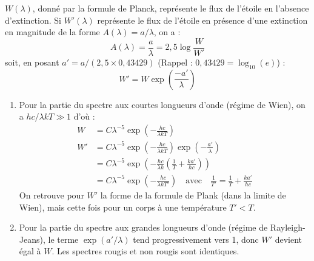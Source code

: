 \documentclass[a4paper,10pt]{report}
\begin{document}
\begin{Answer}
  $W(\lambda)$, donné par la formule de Planck, représente le flux de
  l'étoile en l'absence d'extinction.  Si $W'(\lambda)$ représente le
  flux de l'étoile en présence d'une extinction en magnitude de la
  forme $A(\lambda) = a/\lambda$, on a :
  $$
  A(\lambda)= \frac{a}{\lambda} = 2,5 \log\frac{W}{W'}
  $$
  soit, en posant $a' = a/(2,5 \times0,43429)$ (Rappel : $0,43429 =
  \log_{10}(e)$) :
  $$
  W' = W \exp\left(\frac{-a'}{\lambda}\right)
  $$

  \begin{enumerate}
  \item Pour la partie du spectre aux courtes longueurs d'onde (régime
    de Wien), on a $hc/\lambda kT \gg 1$ d'où :
    \begin{align*}
      W  &= C\lambda^{-5}\exp\left(-\frac{hc}{\lambda kT}\right) \\
      W' &= C\lambda^{-5}\exp\left(-\frac{hc}{\lambda kT}\right)
      \exp\left(-\frac{a'}{\lambda}\right) \\
      &= C\lambda^{-5}\exp\left(-\frac{hc}{\lambda k}
        \left(\frac{1}{T}+\frac{ka'}{hc}\right)\right) \\
      &= C\lambda^{-5}\exp\left(-\frac{hc}{\lambda kT'}\right)
      \quad\text{avec}\quad
      \frac{1}{T'} = \frac{1}{T} + \frac{ka'}{hc}
    \end{align*}
    On retrouve pour $W'$ la forme de la formule de Plank (dans la
    limite de Wien), mais cette fois pour un corps à une température
    $T' < T$.

  \item Pour la partie du spectre aux grandes longueurs d'onde (régime
    de Rayleigh-Jeans), le terme $\exp(a'/\lambda)$ tend
    progressivement vers 1, donc $W'$ devient égal à $W$. Les spectres
    rougis et non rougis sont identiques.
  \end{enumerate}
\end{Answer}
\end{document}
